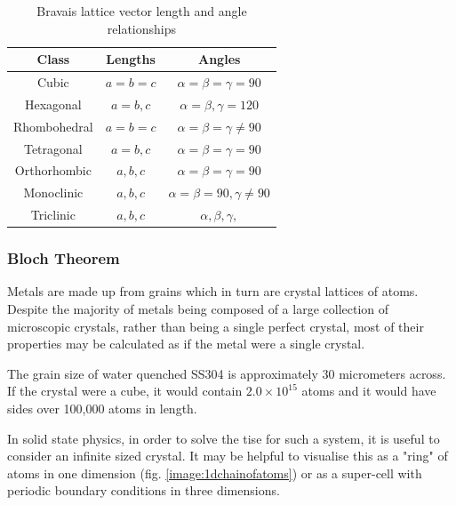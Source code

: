 \begin{table}[h]
\begin{center}
\renewcommand{\arraystretch}{1.2}
\begin{tabular}{c c c}
\hline\hline
Class & Lengths & Angles \\
\hline\hline
Cubic & $a = b = c$ & $ \alpha = \beta = \gamma = 90 $ \\
Hexagonal & $a = b, c $ & $ \alpha = \beta, \gamma = 120 $ \\
Rhombohedral & $a = b = c $ & $ \alpha = \beta = \gamma \neq 90 $ \\
Tetragonal & $a = b, c $ & $ \alpha = \beta = \gamma = 90 $ \\
Orthorhombic & $a, b, c $ & $ \alpha = \beta = \gamma = 90 $ \\
Monoclinic & $a, b, c $ & $ \alpha = \beta = 90, \gamma \neq 90 $ \\
Triclinic & $a, b, c $ & $ \alpha, \beta, \gamma, $ \\
\hline
\end{tabular}
\caption{Bravais lattice vector length and angle relationships}
\label{table:bravaisvectors}
\end{center}
\end{table}



\subsubsection{Bloch Theorem}
\label{section:blochtheorem}

Metals are made up from grains which in turn are crystal lattices of atoms.  Despite the majority of metals being composed of a large collection of microscopic crystals, rather than being a single perfect crystal, most of their properties may be calculated as if the metal were a single crystal.

The grain size of water quenched SS304 is approximately 30 micrometers across\cite{grainsizesteel}.  If the crystal were a cube, it would contain $2.0 \times 10^{15}$ atoms and it would have sides over 100,000 atoms in length.

In solid state physics, in order to solve the \acrshort{tise} for such a system, it is useful to consider an infinite sized crystal.  It may be helpful to visualise this as a "ring" of atoms in one dimension (fig. \ref{image:1dchainofatoms}) or as a super-cell with periodic boundary conditions in three dimensions.


